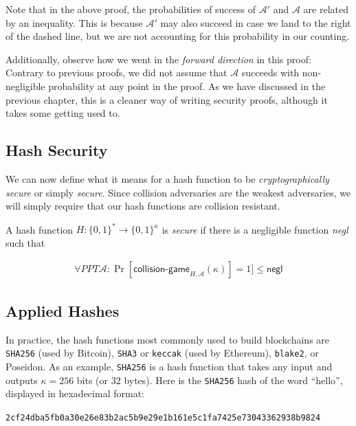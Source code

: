 Note that in the above proof, the probabilities of success of $\mathcal{A}'$
and $\mathcal{A}$ are related by an inequality. This is because $\mathcal{A}'$
may also succeed in case we land to the right of the dashed line, but we are not
accounting for this probability in our counting.

Additionally, observe how we went in the \emph{forward direction} in this proof:
Contrary to previous proofs, we did not assume that $\mathcal{A}$ succeeds with non-negligible
probability at any point in the proof. As we have discussed in the previous chapter,
this is a cleaner way of writing security proofs, although it takes some getting used to.

\subsection*{Hash Security}

We can now define what it means for a hash function to be \emph{cryptographically secure}
or simply \emph{secure}. Since collision adversaries are the weakest adversaries, we will
simply require that our hash functions are collision resistant.

\begin{definition}
  A hash function $H: \{0, 1\}^* \longrightarrow \{0, 1\}^\kappa$ is \emph{secure} if there is a negligible function \emph{negl} such that

  \begin{gather*}
    \forall PPT \mathcal{A}:
      \Pr[\textsf{collision-game}_{H,\mathcal{A}}(\kappa)] = 1] \leq \textsf{negl}
  \end{gather*}
\end{definition}

\subsection*{Applied Hashes}

In practice, the hash functions most commonly used to build blockchains are
\texttt{SHA256} (used by Bitcoin), \texttt{SHA3} or \texttt{keccak} (used by Ethereum),
\texttt{blake2}, or Poseidon. As an example, \texttt{SHA256} is a hash function that takes
any input and outputs $\kappa = 256$ bits (or $32$ bytes). Here is the \texttt{SHA256} hash
of the word ``hello'', displayed in hexadecimal format:

\texttt{2cf24dba5fb0a30e26e83b2ac5b9e29e1b161e5c1fa7425e73043362938b9824}

